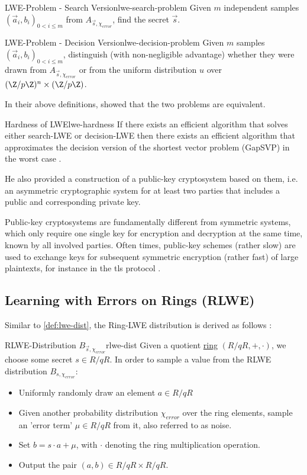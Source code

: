 \begin{definition}{LWE-Problem - Search Version}{lwe-search-problem}
  Given $m$ independent samples $(\vec{a}_i, b_i)_{0 < i \leq m}$ from $A_{\vec{s}, \chi_{error}}$, find the secret $\vec{s}$.
\end{definition}
\begin{definition}{LWE-Problem - Decision Version}{lwe-decision-problem}
  Given $m$ samples $(\vec{a}_i, b_i)_{0 < i \leq m}$, distinguish (with non-negligible advantage) whether they were drawn from $A_{\vec{s}, \chi_{error}}$ or from the uniform distribution $u$ over $(\Z / p \Z)^n \times (\Z / p \Z)$.
\end{definition}

In their above definitions, \citeauthor{2005-lwe-original} showed that the two problems are equivalent.

\begin{theorem}{Hardness of LWE}{lwe-hardness}
  If there exists an efficient algorithm that solves either search-LWE or decision-LWE then there exists an efficient algorithm that approximates the decision version of the shortest vector problem (GapSVP) in the worst case \parencite{2010-lwe-survey}.
\end{theorem}

He also provided a construction of a public-key cryptosystem based on them, i.e. an asymmetric cryptographic system for at least two parties that includes a public and corresponding private key.

Public-key cryptosystems are fundamentally different from symmetric systems, which only require one single key for encryption and decryption at the same time, known by all involved parties.
Often times, public-key schemes (rather slow) are used to exchange keys for subsequent symmetric encryption (rather fast) of large plaintexts, for instance in the \gls{tls} protocol \parencite{rfc8446}.

\subsection{Learning with Errors on Rings (RLWE)}
Similar to \cref{def:lwe-dist}, the Ring-LWE distribution is derived as follows \parencite{2010-rlwe-original}:

\begin{corollary}{RLWE-Distribution $B_{\vec{s}, \chi_{error}}$}{rlwe-dist}
  Given a quotient \hyperref[def:ring]{ring} $(R/qR, +, \cdot)$, we choose some secret $s \in R/qR$.
  In order to sample a value from the RLWE distribution $B_{s, \chi_{error}}$:
  \begin{itemize}
    \item Uniformly randomly draw an element $a \in R/qR$
    \item Given another probability distribution $\chi_{error}$ over the ring elements,
          sample an 'error term' $\mu \in R/qR$ from it, also referred to as noise.
    \item Set $b = s \cdot a + \mu$, with $\cdot$ denoting the ring multiplication operation.
    \item Output the pair $(a, b) \in R/qR \times R/qR$.
  \end{itemize}
\end{corollary}

